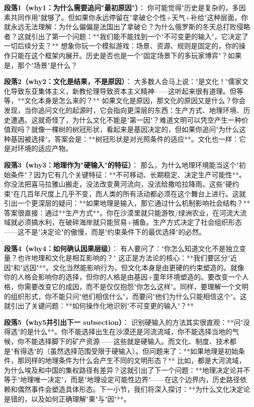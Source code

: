 \documentclass[openany, a4paper, 12pt]{book}
\begin{document}
	\textbf{段落1（why1：为什么需要追问"最初原因"）}：  
	你可能觉得"历史是复杂的，多因素共同作用"就够了。但如果你永远停留在"拿破仑个性+天气+补给"这种层面，你就永远无法理解：为什么偏偏是法国出了拿破仑？为什么俄罗斯的冬天总打败侵略者？这就引出了第一个问题：**我们能不能找到一个"不可变更的输入"，它决定了一切后续分支？** 想象你玩一个模拟游戏：场景、资源、规则是固定的，你的操作只能在这个框架内展开。历史是否也是一个"固定场景下的多玩家博弈"？如果是，那个"场景"是什么？
	
	\textbf{段落2（why2：文化是结果，不是原因）}：  
	大多数人会马上说："是文化！"儒家文化导致东亚集体主义，新教伦理导致资本主义精神——这听起来很有道理。但等等，**文化本身是怎么来的？** 如果文化是原因，那文化的原因又是什么？你会发现，当你追问文化的起源时，它会指向更深层的东西：生产方式、地理环境、历史遭遇。这就奇怪了，为什么文化不能是"第一因"？难道文明可以凭空产生一种价值观吗？就像一棵树的树冠形状，看起来是基因决定的，但如果你追问"为什么这种基因被选择"，答案会是：**树冠形状是对光照条件的适应**。文化也一样：它是对环境的适应产物。
	
	\textbf{段落3（why3：地理作为"硬输入"的特征）}：  
	那么，为什么地理环境能当这个"初始条件"？因为它有几个关键特征：**不可移动、长期稳定、决定生产可能性**。你没法把喜马拉雅山搬走，没法改变黄河流向，没法给撒哈拉降雨。这些"硬约束"在几百年尺度上几乎不变，而人类的所有活动都必须在这个舞台上进行。这就引出一个更深层的疑问：**如果地理是输入，那它通过什么机制影响社会结构？** 答案很直接：通过**生产方式**。你在沙漠里就只能游牧/绿洲农业，在河流大流域就必须搞水利，在破碎海岸就只能贸易+捕鱼。生产方式决定了社会组织形态——这不是"决定论"的傲慢，而是"约束条件下的最优选择"的必然。
	
	\textbf{段落4（why4：如何确认因果层级）}：  
	有人要问了："你怎么知道文化不是独立变量？也许地理和文化是相互影响的？" 这正是方法论的核心：**我们要区分"近因"和"远因"**。文化当然能影响行为，但文化本身是由更硬的约束塑造的。就像你的人格会影响你的选择，但你的人格是由基因+童年环境塑造的。要改变一个人格，你需要改变它的成因，而不是仅仅抱怨"你怎么这样"。同样，要理解一个文明的组织形式，你不能只问"他们相信什么"，而要问"他们为什么只能相信这个"。这就引出了关键问题：**如何操作化地识别"不可变更的输入"？**
	
	\textbf{段落5（why5并引出下一 subsection）}：  
	识别硬输入的方法其实很直观：**问"没得选"的是什么**。你不能选择出生在沙漠还是河流流域，你不能选择当地的气候，你不能选择脚下的矿产资源——这些就是硬输入。而文化、制度、技术都是"有得选"的（虽然选择范围受限于硬输入）。但问题来了：**如果地理是初始条件，那同样的地理条件为什么会产生不同的文明形态？** 比如，都是大河流域，为什么埃及和中国的集权路径有差异？这就引出了下一个问题：**地理决定论并不等于"地理唯一决定"，而是"地理设定可能性边界"——在这个边界内，历史路径依赖和偶然事件会塑造具体形态。下一小节，我们将深入探讨：**为什么文化决定论是错的，以及如何正确理解"果"与"因"**。
	
\end{document}
